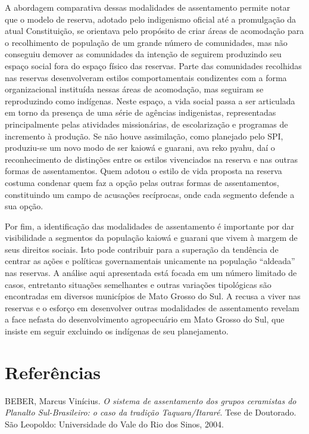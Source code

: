 A abordagem comparativa dessas modalidades de assentamento permite notar
que o modelo de reserva, adotado pelo indigenismo oficial até a
promulgação da atual Constituição, se orientava pelo propósito de criar
áreas de acomodação para o recolhimento de população de um grande
número de comunidades, mas não conseguiu demover as comunidades da
intenção de seguirem produzindo seu espaço social fora do espaço físico
das reservas. Parte das comunidades recolhidas nas reservas
desenvolveram estilos comportamentais condizentes com a forma
organizacional instituída nessas áreas de acomodação, mas seguiram se
reproduzindo como indígenas. Neste espaço, a vida social passa a ser
articulada em torno da presença de uma série de agências indigenistas,
representadas principalmente pelas atividades missionárias, de
escolarização e programas de incremento à produção. Se não houve
assimilação, como planejado pelo SPI, produziu-se um novo modo de ser
kaiowá e guarani, ava reko pyahu, daí o reconhecimento de distinções
entre os estilos vivenciados na reserva e nas outras formas de
assentamentos. Quem adotou o estilo de vida proposta na reserva costuma
condenar quem faz a opção pelas outras formas de assentamentos,
constituindo um campo de acusações recíprocas, onde cada segmento
defende a sua opção.

Por fim, a identificação das modalidades de assentamento é importante
por dar visibilidade a segmentos da população kaiowá e guarani que
vivem à margem de seus direitos sociais. Isto pode contribuir para a
superação da tendência de centrar as ações e políticas governamentais
unicamente na população ``aldeada'' nas reservas. A análise aqui
apresentada está focada em um número limitado de casos, entretanto
situações semelhantes e outras variações tipológicas são encontradas em
diversos municípios de Mato Grosso do Sul. A recusa a viver nas
reservas e o esforço em desenvolver outras modalidades de assentamento
revelam a face nefasta do desenvolvimento agropecuário em Mato Grosso
do Sul, que insiste em seguir excluindo os indígenas de seu
planejamento.

\section{Referências}

BEBER, Marcus Vinícius. \emph{O sistema de assentamento dos grupos ceramistas
do Planalto Sul-Brasileiro: o caso da tradição Taquara/Itararé}. Tese de
Doutorado. São Leopoldo: Universidade do Vale do Rio dos Sinos, 2004.

